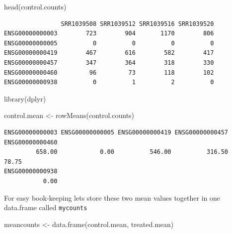 \documentclass[
  letterpaper,
  DIV=11,
  numbers=noendperiod]{scrartcl}
\newenvironment{Shaded}{\begin{snugshade}}{\end{snugshade}}
\newcommand{\FunctionTok}[1]{\textcolor[rgb]{0.28,0.35,0.67}{#1}}
\newcommand{\NormalTok}[1]{\textcolor[rgb]{0.00,0.23,0.31}{#1}}
\newcommand{\OtherTok}[1]{\textcolor[rgb]{0.00,0.23,0.31}{#1}}
\newcommand{\SpecialCharTok}[1]{\textcolor[rgb]{0.37,0.37,0.37}{#1}}
\newcommand{\StringTok}[1]{\textcolor[rgb]{0.13,0.47,0.30}{#1}}
\begin{document}
\begin{Shaded}
\begin{Highlighting}[]
\FunctionTok{head}\NormalTok{(control.counts)}
\end{Highlighting}
\end{Shaded}

\begin{verbatim}
                SRR1039508 SRR1039512 SRR1039516 SRR1039520
ENSG00000000003        723        904       1170        806
ENSG00000000005          0          0          0          0
ENSG00000000419        467        616        582        417
ENSG00000000457        347        364        318        330
ENSG00000000460         96         73        118        102
ENSG00000000938          0          1          2          0
\end{verbatim}

\begin{Shaded}
\begin{Highlighting}[]
\FunctionTok{library}\NormalTok{(dplyr)}

\NormalTok{control.mean }\OtherTok{\textless{}{-}} \FunctionTok{rowMeans}\NormalTok{(control.counts)}
\end{Highlighting}
\end{Shaded}

\begin{Shaded}
\end{Shaded}

\begin{verbatim}
ENSG00000000003 ENSG00000000005 ENSG00000000419 ENSG00000000457 ENSG00000000460 
         658.00            0.00          546.00          316.50           78.75 
ENSG00000000938 
           0.00 
\end{verbatim}

For easy book-keeping lets store these two mean values together in one
data.frame called \texttt{mycounts}

\begin{Shaded}
\begin{Highlighting}[]
\NormalTok{meancounts }\OtherTok{\textless{}{-}} \FunctionTok{data.frame}\NormalTok{(control.mean, treated.mean)}
\end{Highlighting}
\end{Shaded}
\end{document}
